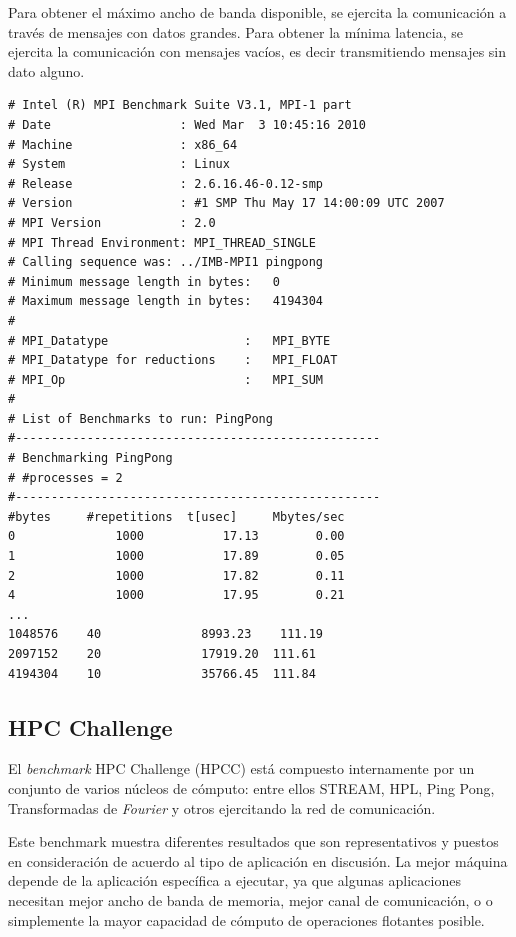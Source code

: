 \documentclass[a4paper]{report}
\begin{document}
\bigskip

Para obtener el máximo ancho de banda disponible, se ejercita la comunicación a través de mensajes con datos grandes. Para obtener la mínima latencia, se ejercita la comunicación con mensajes vacíos, es decir transmitiendo mensajes sin dato alguno.

{\small
\begin{verbatim}
# Intel (R) MPI Benchmark Suite V3.1, MPI-1 part
# Date                  : Wed Mar  3 10:45:16 2010
# Machine               : x86_64
# System                : Linux
# Release               : 2.6.16.46-0.12-smp
# Version               : #1 SMP Thu May 17 14:00:09 UTC 2007
# MPI Version           : 2.0
# MPI Thread Environment: MPI_THREAD_SINGLE
# Calling sequence was: ../IMB-MPI1 pingpong
# Minimum message length in bytes:   0
# Maximum message length in bytes:   4194304
#
# MPI_Datatype                   :   MPI_BYTE
# MPI_Datatype for reductions    :   MPI_FLOAT
# MPI_Op                         :   MPI_SUM
#
# List of Benchmarks to run: PingPong
#---------------------------------------------------
# Benchmarking PingPong
# #processes = 2
#---------------------------------------------------
#bytes     #repetitions  t[usec]     Mbytes/sec
0              1000           17.13        0.00
1              1000           17.89        0.05
2              1000           17.82        0.11
4              1000           17.95        0.21
...
1048576    40              8993.23    111.19
2097152    20              17919.20  111.61
4194304    10              35766.45  111.84
\end{verbatim}
}

\subsection{HPC Challenge}

El {\it benchmark} HPC Challenge \cite{hpcc} (HPCC) está compuesto internamente por un conjunto de
varios núcleos de cómputo: entre ellos STREAM, HPL, Ping Pong, Transformadas de {\it Fourier}
y otros ejercitando la red de comunicación.

\bigskip

Este benchmark muestra diferentes resultados que son representativos
y puestos en consideración de acuerdo al tipo de aplicación en discusión.
La mejor máquina depende de la aplicación específica a ejecutar, ya que algunas
aplicaciones necesitan mejor ancho de banda de memoria, mejor canal de comunicación, o
o simplemente la mayor capacidad de cómputo de operaciones flotantes posible.
\end{document}
